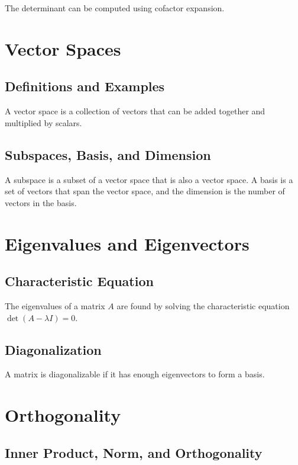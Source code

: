 \documentclass{article}
\begin{document}
The determinant can be computed using cofactor expansion.

\section{Vector Spaces}

\subsection{Definitions and Examples}

A vector space is a collection of vectors that can be added together and multiplied by scalars.

\subsection{Subspaces, Basis, and Dimension}

A subspace is a subset of a vector space that is also a vector space. A basis is a set of vectors that span the vector space, and the dimension is the number of vectors in the basis.

\section{Eigenvalues and Eigenvectors}

\subsection{Characteristic Equation}

The eigenvalues of a matrix \(A\) are found by solving the characteristic equation \(\det(A - \lambda I) = 0\).

\subsection{Diagonalization}

A matrix is diagonalizable if it has enough eigenvectors to form a basis.

\section{Orthogonality}

\subsection{Inner Product, Norm, and Orthogonality}
\end{document}
